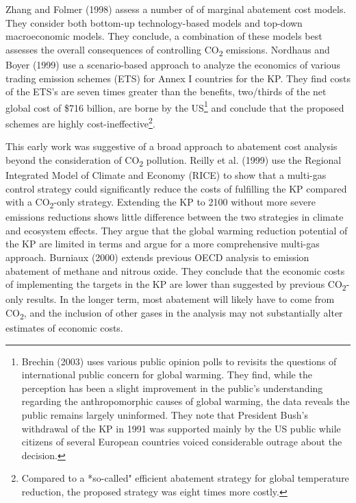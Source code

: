 \documentclass[
  10pt,
]{article}
\begin{document}
Zhang and Folmer (1998) assess a number of of marginal
abatement cost models. They consider both bottom-up technology-based
models and top-down macroeconomic models. They conclude, a combination
of these models best assesses the overall consequences of controlling
CO\textsubscript{2} emissions. Nordhaus and Boyer (1999) use a
scenario-based approach to analyze the economics of various trading
emission schemes (ETS) for Annex I countries for the KP. They find costs
of the ETS's are seven times greater than the benefits, two/thirds of
the net global cost of \$716 billion, are borne by the US\footnote{Brechin
  (2003) uses various public opinion polls to revisits the questions of
  international public concern for global warming. They find, while the
  perception has been a slight improvement in the public's understanding
  regarding the anthropomorphic causes of global warming, the data reveals
  the public remains largely uninformed. They note that President Bush's
  withdrawal of the KP in 1991 was supported mainly by the US public
  while citizens of several European countries voiced considerable
  outrage about the decision.} and conclude that the proposed schemes
are highly cost-ineffective\footnote{Compared to a *so-called" efficient
  abatement strategy for global temperature reduction, the proposed
  strategy was eight times more costly.}.

This early work was suggestive of a broad approach to abatement cost
analysis beyond the consideration of CO\textsubscript{2} pollution.
Reilly et al. (1999) use the Regional Integrated Model of Climate and
Economy (RICE) to show that a multi-gas control strategy could
significantly reduce the costs of fulfilling the KP compared with a
CO\textsubscript{2}-only strategy. Extending the KP to 2100 without more
severe emissions reductions shows little difference between the two
strategies in climate and ecosystem effects. They argue that the global
warming reduction potential of the KP are limited in terms and argue for a more
comprehensive multi-gas approach. Burniaux (2000) extends previous OECD
analysis to emission abatement of methane and nitrous oxide. They
conclude that the economic costs of implementing the targets in the KP
are lower than suggested by previous CO\textsubscript{2}-only results.
In the longer term, most abatement will likely have to come from
CO\textsubscript{2}, and the inclusion of other gases in the analysis
may not substantially alter estimates of economic costs.
\end{document}
